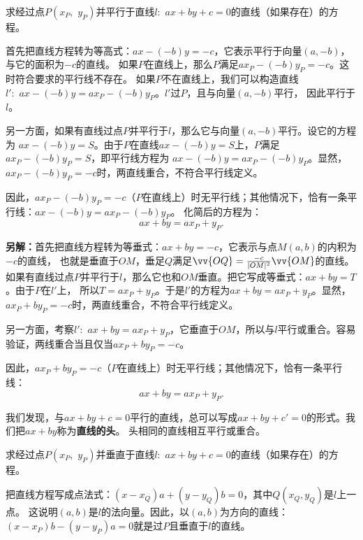 \documentclass[12pt,UTF8]{ctexbook}
\begin{document}
\begin{ex}
    求经过点$P(x_P, \,\,y_P)$并平行于直线$l: \,\, ax + by + c = 0$的直线（如果存在）的方程。
\end{ex}
\begin{so}
首先把直线方程转为等高式：$ax - (-b)y = -c$，它表示平行于向量$(a, -b)$，与它的面积为$-c$的直线。
如果$P$在直线上，那么$P$满足$ax_P - (-b)y_P = -c$。这时符合要求的平行线不存在。
如果$P$不在直线上，我们可以构造直线$l' : \,\, ax - (-b)y = ax_P - (-b)y_P$。$l'$过$P$，且与向量$(a, -b)$平行，
因此平行于$l$。

另一方面，如果有直线过点$P$并平行于$l$，那么它与向量$(a, -b)$平行。设它的方程为
$ax - (-b)y = S$。由于$P$在直线$ax - (-b)y = S$上，$P$满足$ax_P - (-b)y_P = S$，即平行线方程为
$ax - (-b)y = ax_P - (-b)y_P$。显然，$ax_P - (-b)y_P = -c$时，两直线重合，不符合平行线定义。

因此，$ax_P - (-b)y_P = -c$（$P$在直线上）时无平行线；其他情况下，恰有一条平行线：$ax - (-b)y = ax_P - (-b)y_P$。
化简后的方程为：
$$ax + by = ax_P + y_P.$$

\textbf{另解：}首先把直线方程转为等垂式：$ax + by = -c$，它表示与点$M(a, b)$的内积为$-c$的直线，
也就是垂直于$OM$，垂足$Q$满足$\vv{OQ} = \frac{-c}{|OM|^2}\vv{OM}$的直线。
如果有直线过点$P$并平行于$l$，那么它也和$OM$垂直。把它写成等垂式：$ax + by = T$。由于$P$在$l'$上，
所以$T = ax_P + y_P$。于是$l'$的方程为$ax + by = ax_P + y_P$。显然，$ax_P + by_P = -c$时，两直线重合，不符合平行线定义。

另一方面，考察$l' : \,\, ax + by = ax_P + y_P$，它垂直于$OM$，所以与$l$平行或重合。容易验证，两线重合当且仅当$ax_P + by_P = -c$。

因此，$ax_P + by_P = -c$（$P$在直线上）时无平行线；其他情况下，恰有一条平行线：
$$ax + by = ax_P + y_P.$$

我们发现，与$ax + by + c = 0$平行的直线，总可以写成$ax + by + c' = 0$的形式。我们把$ax + by$称为\textbf{直线的头}。
头相同的直线相互平行或重合。
\end{so}

\begin{et}
    求经过点$P(x_P, \,\,y_P)$并垂直于直线$l: \,\, ax + by + c = 0$的直线（如果存在）的方程。
\end{et}
\begin{so}
    把直线方程写成点法式：$(x - x_Q)a + (y - y_Q)b = 0$，其中$Q(x_Q, y_Q)$是$l$上一点。
这说明$(a, b)$是$l$的法向量。因此，以$(a, b)$为方向的直线：$(x - x_P)b - (y - y_P)a = 0$就是过$P$且垂直于$l$的直线。
\end{so}
\end{document}
